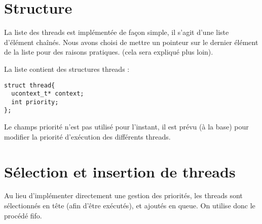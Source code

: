 \section{Structure}
La liste des threads est implémentée de façon simple, il s'agit d'une liste d'élément chaînés. Nous avons choisi de mettre un pointeur sur le dernier élément de la liste pour des raisons pratiques. (cela sera expliqué plus loin).

La liste contient des structures threads :
\begin{verbatim}
struct thread{
  ucontext_t* context;
  int priority;
};
\end{verbatim}

Le champs priorité n'est pas utilisé pour l'instant, il est prévu (à la base) pour modifier la priorité d'exécution des différents threads.

\section{Sélection et insertion de threads}
Au lieu d'implémenter directement une gestion des priorités, les threads sont sélectionnés en tête (afin d'être exécutés), et ajoutés en queue. On utilise donc le procédé fifo.

